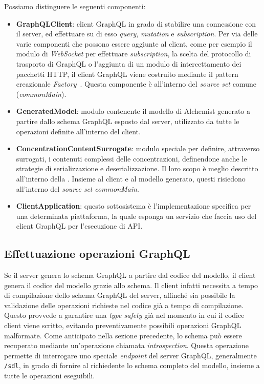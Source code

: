 Possiamo distinguere le seguenti componenti:
\begin{itemize}
    \item \textbf{GraphQLClient}: client GraphQL in grado di stabilire una connessione con il server, ed effettuare su di esso \textit{query}, \textit{mutation} e \textit{subscription}.
        Per via delle varie componenti che possono essere aggiunte al client, come per esempio il modulo di \textit{WebSocket} per effettuare \textit{subscription}, la scelta del protocollo
        di trasporto di GraphQL o l'aggiunta di un modulo di intercettamento dei pacchetti HTTP, il client GraphQL viene costruito mediante il pattern creazionale \textit{Factory}~\cite{design-patterns}.
        Questa componente è all'interno del \textit{source set} comune (\textit{commonMain}).
    \item \textbf{GeneratedModel}: modulo contenente il modello di Alchemist generato a partire dallo schema GraphQL esposto dal server, utilizzato da tutte le operazioni definite all'interno del client.
    \item \textbf{ConcentrationContentSurrogate}: modulo speciale per definire, attraverso surrogati, i contenuti complessi delle concentrazioni, definendone anche le strategie di serializzazione e
        deserializzazione. Il loro scopo è meglio descritto all'interno della . Insieme al client e al modello generato, questi risiedono all'interno del \textit{source set} \textit{commonMain}.
    \item \textbf{ClientApplication}: questo sottosistema è l'implementazione specifica per una determinata piattaforma, la quale esponga un servizio che faccia uso del client GraphQL per l'esecuzione
        di \ac{API}.
\end{itemize}

\subsection{Effettuazione operazioni GraphQL}\label{ssec:client-gql-apis}
Se il server genera lo schema GraphQL a partire dal codice del modello, il client genera il codice del modello grazie allo schema. Il client infatti
necessita a tempo di compilazione dello schema GraphQL del server, affinché sia possibile la validazione delle operazioni richieste nel codice
già a tempo di compilazione. Questo provvede a garantire una \textit{type safety} già nel momento in cui il codice client viene scritto, evitando
preventivamente possibili operazioni GraphQL malformate. Come anticipato nella sezione precedente, lo schema può essere recuperato mediante un'operazione
chiamata \textit{introspection}. Questa operazione permette di interrogare uno speciale \textit{endpoint} del server GraphQL, generalmente \texttt{/sdl},
in grado di fornire al richiedente lo schema completo del modello, insieme a tutte le operazioni eseguibili.

